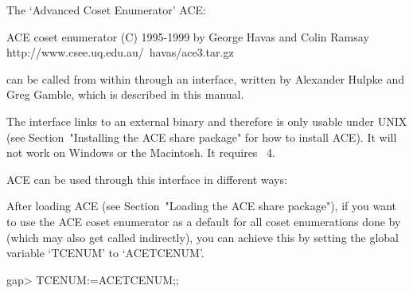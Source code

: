 
\def\ACE{{\sf ACE}}

The  \lq Advanced Coset Enumerator' {\ACE}:

\begintt
ACE coset enumerator (C) 1995-1999 by George Havas and Colin Ramsay
    http://www.csee.uq.edu.au/~havas/ace3.tar.gz
\endtt

can  be called  from within  {\GAP} through  an interface,  written by
Alexander Hulpke and Greg Gamble, which is described in this manual.

The interface links to an external binary and therefore is only usable
under UNIX (see Section~"Installing the ACE share package" for how  to
install {\ACE}).  It will not work  on  Windows  or the Macintosh.  It
requires {\GAP}~4.

{\ACE} can be used through this interface in different ways:


After loading  {\ACE}   (see Section~"Loading the ACE share package"),
if you  want to use the {\ACE}  coset enumerator as a  default for all
coset  enumerations  done  by   {\GAP}  (which  may  also  get  called
indirectly),  you can  achieve  this by  setting  the global  variable
`TCENUM' to `ACETCENUM'.

\begintt
gap> TCENUM:=ACETCENUM;;
\endtt

